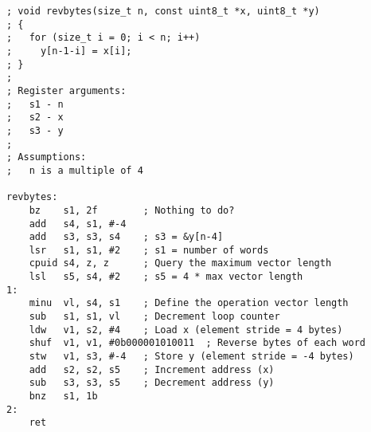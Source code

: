 \begin{lstlisting}[style=assembler]
; void revbytes(size_t n, const uint8_t *x, uint8_t *y)
; {
;   for (size_t i = 0; i < n; i++)
;     y[n-1-i] = x[i];
; }
;
; Register arguments:
;   s1 - n
;   s2 - x
;   s3 - y
;
; Assumptions:
;   n is a multiple of 4

revbytes:
    bz    s1, 2f        ; Nothing to do?
    add   s4, s1, #-4
    add   s3, s3, s4    ; s3 = &y[n-4]
    lsr   s1, s1, #2    ; s1 = number of words
    cpuid s4, z, z      ; Query the maximum vector length
    lsl   s5, s4, #2    ; s5 = 4 * max vector length
1:
    minu  vl, s4, s1    ; Define the operation vector length
    sub   s1, s1, vl    ; Decrement loop counter
    ldw   v1, s2, #4    ; Load x (element stride = 4 bytes)
    shuf  v1, v1, #0b000001010011  ; Reverse bytes of each word
    stw   v1, s3, #-4   ; Store y (element stride = -4 bytes)
    add   s2, s2, s5    ; Increment address (x)
    sub   s3, s3, s5    ; Decrement address (y)
    bnz   s1, 1b
2:
    ret
\end{lstlisting}

\twocolumn
